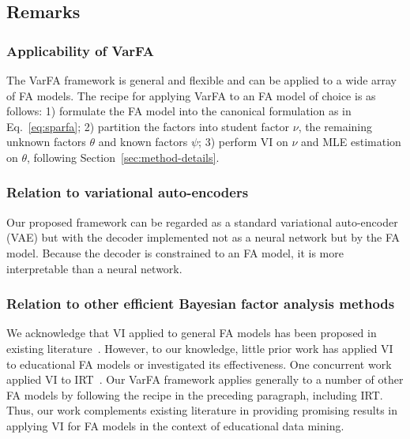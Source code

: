 \subsection{Remarks}
%
\subsubsection*{Applicability of VarFA} The VarFA framework is general and flexible and can be applied to a wide array
of FA models. The recipe for applying VarFA to an FA model of choice is as
follows: 1) formulate the FA model into the canonical formulation as in
Eq.~\ref{eq:sparfa}; 2) partition the factors into student factor $\nu$, the
remaining unknown factors $\theta$ and known factors $\psi$; 3) perform VI on
$\nu$ and MLE estimation on $\theta$, following
Section~\ref{sec:method-details}.

\subsubsection*{Relation to variational auto-encoders}Our proposed framework can be regarded as a standard variational auto-encoder
(VAE) but with the decoder implemented not as a neural network but by the FA
model. Because the decoder is constrained to an FA model, it is more
interpretable than a neural network.

\subsubsection*{Relation to other efficient Bayesian factor analysis methods}
We acknowledge that VI applied to general FA models has been proposed in
existing literature~\cite{ghahramani2000variational,zhao2009note}. However, to
our knowledge, little prior work has applied VI to educational FA models or
investigated its effectiveness. One concurrent work applied VI to
IRT~\cite{wu2020variational}. Our VarFA framework applies generally to a number
of other FA models by following the recipe in the preceding paragraph,
including IRT. Thus, our work complements existing literature in providing
promising results in applying VI for FA models in the context of educational
data mining.
%
